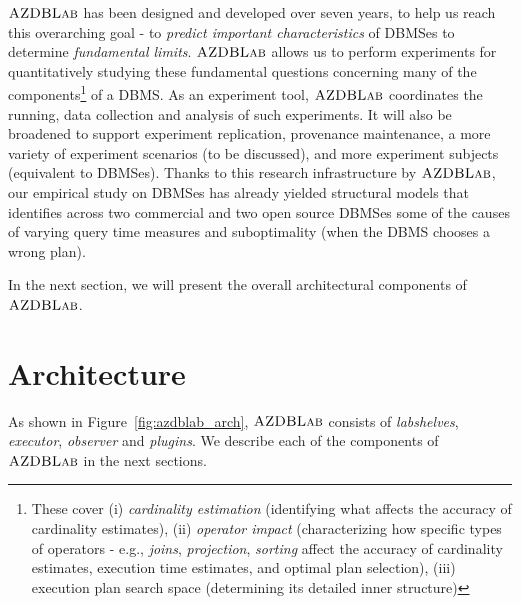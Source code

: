 \documentclass[conference]{IEEEtran}
\def\azdb{\hbox{\sc AZDBLab}}
\begin{document}
$\azdb$ has been designed and developed over seven years, to help us 
reach this overarching goal - to {\em predict important characteristics} of DBMSes to determine {\em fundamental limits}.  
$\azdb$ allows us to perform experiments for quantitatively studying these fundamental questions concerning 
many of the components\footnote{These cover (i) {\em cardinality estimation} (identifying what affects the accuracy of cardinality estimates), 
(ii) {\em operator impact} (characterizing how specific types of operators - e.g., {\em joins}, {\em projection}, 
{\em sorting} affect the accuracy of cardinality estimates, execution time estimates, and optimal plan selection),
(iii) execution plan search space (determining its detailed inner structure)} of a DBMS. 
As an experiment tool, $\azdb$ coordinates the running, data collection and analysis of such experiments. 
It will also be broadened to support experiment replication, provenance maintenance, a more variety of experiment 
scenarios (to be discussed), and more experiment subjects (equivalent to DBMSes). 
Thanks to this research infrastructure by $\azdb$, our empirical study on DBMSes 
has already yielded structural models that identifies across two commercial and two open source DBMSes 
some of the causes of varying query time measures\cite{Currim} and suboptimality (when the DBMS chooses a wrong plan).

In the next section, we will present the overall architectural components of $\azdb$. 


\section{Architecture}\label{sec:architecture}
As shown in Figure~\ref{fig:azdblab_arch}, $\azdb$ consists of {\em labshelves}, 
{\em executor},  {\em observer} and {\em plugins}. 
We describe each of the components of $\azdb$ in the next sections. 
\end{document}
